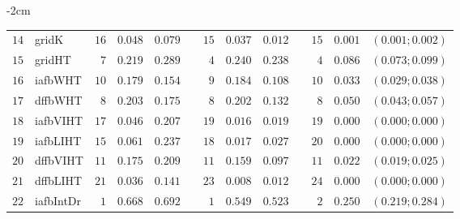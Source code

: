 \begin{table*}[!htbp]
\begin{adjustwidth*}{}{-2cm}
\begin{tabular}{@{}rlrrrrrrrrrcc@{}}
\footnotesize{$14$} & \footnotesize{gridK    } & \footnotesize{$16$} & \footnotesize{$0.048$} & \footnotesize{$0.079$} && \footnotesize{$15$} & \footnotesize{$0.037$} & \footnotesize{$0.012$} && \footnotesize{$15$} & \footnotesize{$0.001$} & \footnotesize{$(0.001;0.002)$} \\
\footnotesize{$15$} & \footnotesize{gridHT   } & \footnotesize{$7 $} & \footnotesize{$0.219$} & \footnotesize{$0.289$} && \footnotesize{$4 $} & \footnotesize{$0.240$} & \footnotesize{$0.238$} && \footnotesize{$4 $} & \footnotesize{$0.086$} & \footnotesize{$(0.073;0.099)$} \\
\footnotesize{$16$} & \footnotesize{iafbWHT  } & \footnotesize{$10$} & \footnotesize{$0.179$} & \footnotesize{$0.154$} && \footnotesize{$9 $} & \footnotesize{$0.184$} & \footnotesize{$0.108$} && \footnotesize{$10$} & \footnotesize{$0.033$} & \footnotesize{$(0.029;0.038)$} \\
\footnotesize{$17$} & \footnotesize{dffbWHT  } & \footnotesize{$8 $} & \footnotesize{$0.203$} & \footnotesize{$0.175$} && \footnotesize{$8 $} & \footnotesize{$0.202$} & \footnotesize{$0.132$} && \footnotesize{$8 $} & \footnotesize{$0.050$} & \footnotesize{$(0.043;0.057)$} \\
\footnotesize{$18$} & \footnotesize{iafbVIHT } & \footnotesize{$17$} & \footnotesize{$0.046$} & \footnotesize{$0.207$} && \footnotesize{$19$} & \footnotesize{$0.016$} & \footnotesize{$0.019$} && \footnotesize{$19$} & \footnotesize{$0.000$} & \footnotesize{$(0.000;0.000)$} \\
\footnotesize{$19$} & \footnotesize{iafbLIHT } & \footnotesize{$15$} & \footnotesize{$0.061$} & \footnotesize{$0.237$} && \footnotesize{$18$} & \footnotesize{$0.017$} & \footnotesize{$0.027$} && \footnotesize{$20$} & \footnotesize{$0.000$} & \footnotesize{$(0.000;0.000)$} \\
\footnotesize{$20$} & \footnotesize{dffbVIHT } & \footnotesize{$11$} & \footnotesize{$0.175$} & \footnotesize{$0.209$} && \footnotesize{$11$} & \footnotesize{$0.159$} & \footnotesize{$0.097$} && \footnotesize{$11$} & \footnotesize{$0.022$} & \footnotesize{$(0.019;0.025)$} \\
\footnotesize{$21$} & \footnotesize{dffbLIHT } & \footnotesize{$21$} & \footnotesize{$0.036$} & \footnotesize{$0.141$} && \footnotesize{$23$} & \footnotesize{$0.008$} & \footnotesize{$0.012$} && \footnotesize{$24$} & \footnotesize{$0.000$} & \footnotesize{$(0.000;0.000)$} \\
\footnotesize{$22$} & \footnotesize{iafbIntDr} & \footnotesize{$1 $} & \footnotesize{$0.668$} & \footnotesize{$0.692$} && \footnotesize{$1 $} & \footnotesize{$0.549$} & \footnotesize{$0.523$} && \footnotesize{$2 $} & \footnotesize{$0.250$} & \footnotesize{$(0.219;0.284)$} \\

\end{tabular}
\end{adjustwidth*}
\end{table*}
